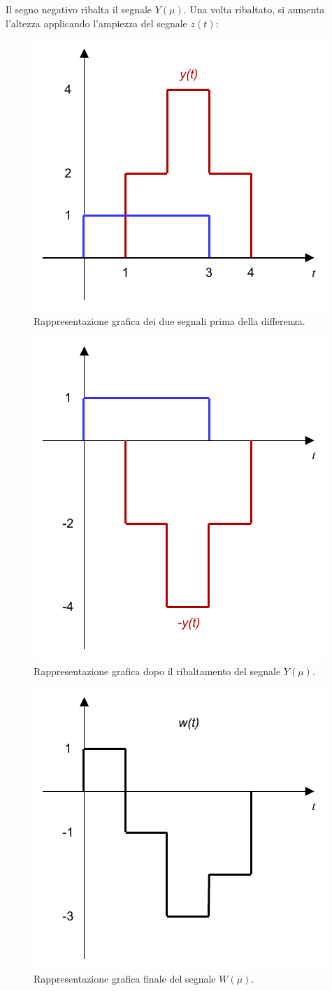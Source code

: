 \documentclass[a4paper]{article}
\begin{document}
	Il segno negativo ribalta il segnale $Y\left(\mu\right)$. Una volta ribaltato, si aumenta l'altezza applicando l'ampiezza del segnale $z\left(t\right)$:
	\begin{figure}[!htp]
		\centering
		\includegraphics[width=.55\textwidth]{img/diff_1.pdf}
		\caption*{Rappresentazione grafica dei due segnali prima della differenza.}
	\end{figure}
	\begin{figure}[!htp]
		\centering
		\includegraphics[width=.55\textwidth]{img/diff_2.pdf}
		\caption*{Rappresentazione grafica dopo il ribaltamento del segnale $Y\left(\mu\right)$.}
	\end{figure}\newpage

	\begin{figure}[!htp]
		\centering
		\includegraphics[width=.55\textwidth]{img/diff_3.pdf}
		\caption*{Rappresentazione grafica finale del segnale $W\left(\mu\right)$.}
	\end{figure}\newpage
\end{document}

